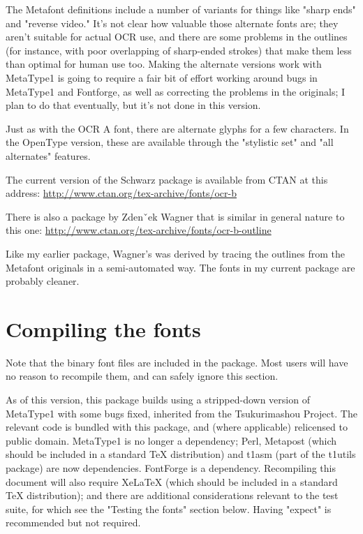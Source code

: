 \documentclass{article}
\begin{document}
The Metafont definitions include a number of variants for things like
"sharp ends" and "reverse video." It's not clear how valuable those
alternate fonts are; they aren't suitable for actual OCR use, and there are
some problems in the outlines (for instance, with poor overlapping of
sharp-ended strokes) that make them less than optimal for human use too. 
Making the alternate versions work with MetaType1 is going to require a fair
bit of effort working around bugs in MetaType1 and Fontforge, as well as
correcting the problems in the originals; I plan to do that eventually, but
it's not done in this version.

Just as with the OCR A font, there are alternate glyphs for a
few characters.  In the OpenType version, these are available through the
"stylistic set" and "all alternates" features.

The current version of the Schwarz package is available from CTAN at this
address:  \url{http://www.ctan.org/tex-archive/fonts/ocr-b}

There is also a package by Zdenˇ\hspace{-0.1in}ek Wagner that is similar
in general nature to this one:
\url{http://www.ctan.org/tex-archive/fonts/ocr-b-outline}

Like my earlier package, Wagner's was derived by tracing the outlines from
the Metafont originals in a semi-automated way.  The fonts in my current
package are probably cleaner.

\section{Compiling the fonts}

Note that the binary font files are included in the package.  Most users
will have no reason to recompile them, and can safely ignore this section.

As of this version, this package builds using a stripped-down version of
MetaType1 with some bugs fixed, inherited from the Tsukurimashou Project. 
The relevant code is bundled with this package, and (where applicable)
relicensed to public domain.  MetaType1 is no longer a dependency; Perl,
Metapost (which should be included in a standard TeX distribution) and t1asm
(part of the t1utils package) are now dependencies.  FontForge is a
dependency.  Recompiling this document will also require XeLaTeX (which
should be included in a standard TeX distribution); and there are additional
considerations relevant to the test suite, for which see the "Testing the
fonts" section below.  Having "expect" is recommended but not required.
\end{document}
